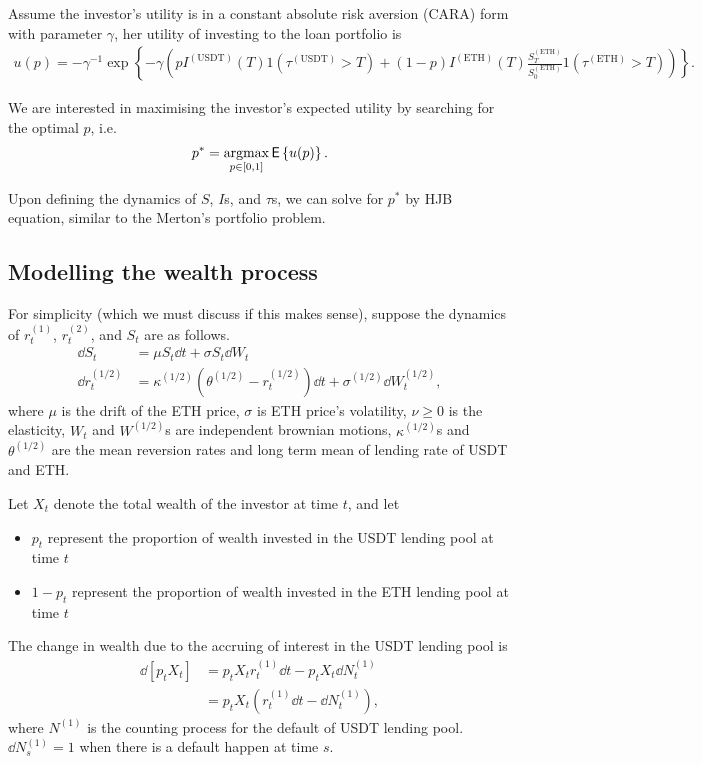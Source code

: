 \documentclass[square]{article} %
\theoremstyle{plain}
\theoremstyle{definition} %
\begin{document}
Assume the investor's utility is in a constant absolute risk aversion (CARA) form with parameter $\gamma$, 
 her utility of investing to the loan portfolio is 
 \begin{align*}
  u(p) = -\gamma^{-1}\exp\left\{ -\gamma\left( p I^{(\text{USDT})}(T)1(\tau^{(\text{USDT})} > T)  + (1-p)I^{(\text{ETH})}(T)\frac{S^{(\text{ETH})}_T}{S^{(\text{ETH})}_0}1(\tau^{(\text{ETH})} > T)\right)\right\}.
 \end{align*}

 We are interested in maximising the investor's expected utility by searching for the optimal $p$, i.e.
 \begin{align*}
  p^* = \argmax_{p \in [0, 1]} \mathbb{\sf E}\left\{u(p)\right\}.
 \end{align*}

Upon defining the dynamics of $S$, $I$s, and $\tau$s, we can solve for $p^*$ by HJB equation, similar to the Merton's portfolio problem. 

\subsection{Modelling the wealth process}
For simplicity (which we must discuss if this makes sense), 
suppose the dynamics of 
$r^{(1)}_t$, $r^{(2)}_t$, and $S_t$ are as follows.
 \begin{align*}
  \dd S_t &= \mu S_t \dd t + \sigma S_t \dd W_t \\ 
  \dd r_t^{(1/2)} &= \kappa^{(1/2)}\left(\theta^{(1/2)}-r_t^{(1/2)}\right)\dd t + \sigma^{(1/2)}\dd W^{(1/2)}_t,
 \end{align*}
where $\mu$ is the drift of the ETH price, $\sigma$ is ETH price's volatility,
$\nu \geq 0$ is the elasticity, 
$W_t$ and $W^{(1/2)}$s are independent brownian motions, 
$\kappa^{(1/2)}$s and $\theta^{(1/2)}$ are the mean reversion rates and long term mean of lending rate of USDT and ETH. 

Let $X_t$ denote the total wealth of the investor at time $t$, and let
\begin{itemize}
\item $p_t$ represent the proportion of wealth invested in the USDT lending pool at time $t$
\item $1-p_t$ represent the proportion of wealth invested in the ETH lending pool at time $t$
 \end{itemize}

The change in wealth due to the accruing of interest in the USDT lending pool is
\begin{align*}
\dd \left[p_t X_t\right] &= p_t X_t r^{(1)}_t \dd t - p_t X_t \dd N^{(1)}_t\\
&= p_t X_t \left(r^{(1)}_t\dd t - \dd N^{(1)}_t\right),
\end{align*}
where $N^{(1)}$ is the counting process for the default of USDT lending pool. 
$\dd N^{(1)}_s = 1$ when there is a default happen at time $s$.\\
\end{document}
